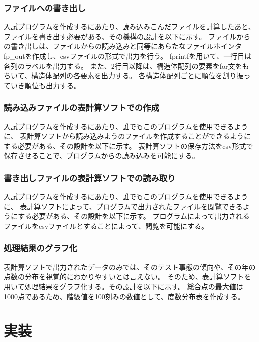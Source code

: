 \documentclass{jsarticle}
\begin{document}
\subsubsection{ファイルへの書き出し}
入試プログラムを作成するにあたり、読み込みこんだファイルを計算したあと、ファイルを書き出す必要がある、その機構の設計を以下に示す。
ファイルからの書き出しは、ファイルからの読み込みと同等にあらたなファイルポインタfp\_outを作成し、csvファイルの形式で出力を行う。
fprintfを用いて、一行目は各列のラベルを出力する。
また、2行目以降は、構造体配列の要素をfor文をもちいて、構造体配列の各要素を出力する。
各構造体配列ごとに順位を割り振っていき順位も出力する。

\subsubsection{読み込みファイルの表計算ソフトでの作成}
入試プログラムを作成するにあたり、誰でもこのプログラムを使用できるように、
表計算ソフトから読み込みようのファイルを作成することができるようにする必要がある、その設計を以下に示す。
表計算ソフトの保存方法をcsv形式で保存させることで、プログラムからの読み込みを可能にする。

\subsubsection{書き出しファイルの表計算ソフトでの読み取り}
入試プログラムを作成するにあたり、誰でもこのプログラムを使用できるように、
表計算ソフトによって、プログラムで出力されたファイルを閲覧できるようにする必要がある、その設計を以下に示す。
プログラムによって出力されるファイルをcsvファイルとすることによって、閲覧を可能にする。

\subsubsection{処理結果のグラフ化}
表計算ソフトで出力されたデータのみでは、そのテスト事態の傾向や、その年の点数の分布を視覚的にわかりやすいとは言えない。
そのため、表計算ソフトを用いて処理結果をグラフ化する。その設計を以下に示す。
総合点の最大値は1000点であるため、階級値を100刻みの数値として、度数分布表を作成する。

\newpage
\section{実装}
\end{document}
